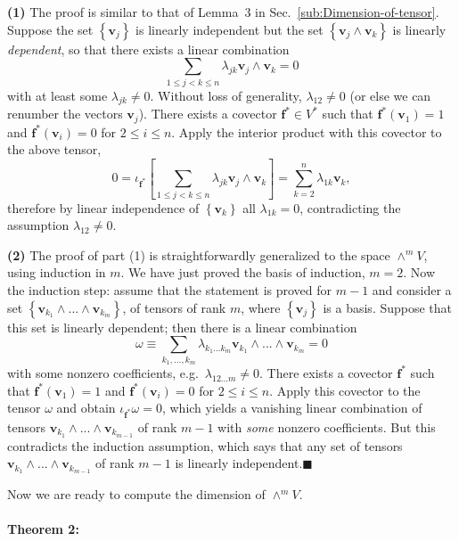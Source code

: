 \textbf{(1)} The proof is similar to that of Lemma~3 in Sec.~\ref{sub:Dimension-of-tensor}.
Suppose the set $\left\{ \mathbf{v}_{j}\right\} $ is linearly independent
but the set $\left\{ \mathbf{v}_{j}\wedge\mathbf{v}_{k}\right\} $
is linearly \emph{dependent}, so that there exists a linear combination\[
\sum_{1\leq j<k\leq n}\lambda_{jk}\mathbf{v}_{j}\wedge\mathbf{v}_{k}=0\]
with at least some $\lambda_{jk}\neq0$. Without loss of generality,
$\lambda_{12}\neq0$ (or else we can renumber the vectors $\mathbf{v}_{j}$).
There exists a covector $\mathbf{f}^{*}\in V^{*}$ such that $\mathbf{f}^{*}\left(\mathbf{v}_{1}\right)=1$
and $\mathbf{f}^{*}\left(\mathbf{v}_{i}\right)=0$ for $2\leq i\leq n$.
Apply the interior product with this covector to the above tensor,\[
0=\iota_{\mathbf{f}^{*}}\left[\sum_{1\leq j<k\leq n}\lambda_{jk}\mathbf{v}_{j}\wedge\mathbf{v}_{k}\right]=\sum_{k=2}^{n}\lambda_{1k}\mathbf{v}_{k},\]
therefore by linear independence of $\left\{ \mathbf{v}_{k}\right\} $
all $\lambda_{1k}=0$, contradicting the assumption $\lambda_{12}\neq0$.

\textbf{(2)} The proof of part (1) is straightforwardly generalized
to the space $\wedge^{m}V$, using induction in $m$. We have just
proved the basis of induction, $m=2$. Now the induction step: assume
that the statement is proved for $m-1$ and consider a set $\left\{ \mathbf{v}_{k_{1}}\wedge...\wedge\mathbf{v}_{k_{m}}\right\} $,
of tensors of rank $m$, where $\left\{ \mathbf{v}_{j}\right\} $
is a basis. Suppose that this set is linearly dependent; then there
is a linear combination \[
\omega\equiv\sum_{k_{1},...,k_{m}}\lambda_{k_{1}...k_{m}}\mathbf{v}_{k_{1}}\wedge...\wedge\mathbf{v}_{k_{m}}=0\]
with some nonzero coefficients, e.g.~$\lambda_{12...m}\neq0$. There
exists a covector $\mathbf{f}^{*}$ such that $\mathbf{f}^{*}\left(\mathbf{v}_{1}\right)=1$
and $\mathbf{f}^{*}\left(\mathbf{v}_{i}\right)=0$ for $2\leq i\leq n$.
Apply this covector to the tensor $\omega$ and obtain $\iota_{\mathbf{f}^{*}}\omega=0$,
which yields a vanishing linear combination of tensors $\mathbf{v}_{k_{1}}\wedge...\wedge\mathbf{v}_{k_{m-1}}$
of rank $m-1$ with \emph{some} nonzero coefficients. But this contradicts
the induction assumption, which says that any set of tensors $\mathbf{v}_{k_{1}}\wedge...\wedge\mathbf{v}_{k_{m-1}}$
of rank $m-1$ is linearly independent.\hfill{}$\blacksquare$

Now we are ready to compute the dimension of $\wedge^{m}V$.


\paragraph{Theorem 2:}

